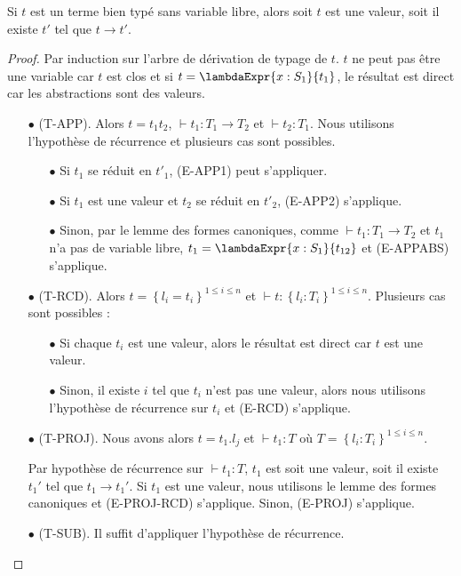 \begin{theorem} [de progression]
  Si $t$ est un terme bien typé sans variable libre, alors soit $t$ est une
  valeur, soit il existe $t'$ tel que $t \rightarrow t'$.
\end{theorem}

\begin{proof}
  Par induction sur l'arbre de dérivation de typage de $t$.
  $t$ ne peut pas être une variable car $t$ est clos et si $t = \lambdaExpr{x :
    S_{1}}{t_{1}}$, le résultat est direct car les abstractions sont des valeurs.
  \begin{itemize}
  \item[$\bullet$] (T-APP). Alors $t = t_{1}t_{2}$, $\vdash t_{1} : T_{1} \rightarrow
    T_{2}$ et $\vdash t_{2} : T_{1}$. Nous utilisons l'hypothèse de récurrence
    et plusieurs cas sont possibles.
    \begin{itemize}
    \item[$\bullet$] Si $t_{1}$ se réduit en $t'_{1}$, (E-APP1) peut s'appliquer.
    \item[$\bullet$] Si $t_{1}$ est une valeur et $t_{2}$ se réduit en $t'_{2}$, (E-APP2) s'applique.
    \item[$\bullet$] Sinon, par le lemme des formes
      canoniques, comme $\vdash t_{1} : T_{1} \rightarrow T_{2}$ et $t_{1}$ n'a
      pas de variable libre, $t_{1} = \lambdaExpr{x : S_{1}}{t_{12}}$ et (E-APPABS) s'applique.
    \end{itemize}
  \item[$\bullet$] (T-RCD). Alors $t = \left\{ l_{i} = t_{i} \right\}^{1 \leq i \leq n}$ et
    $\vdash t : \left\{ l_{i} : T_{i} \right\}^{1 \leq i \leq n}$. Plusieurs cas
    sont possibles :
    \begin{itemize}
    \item[$\bullet$] Si chaque $t_{i}$ est une valeur, alors le résultat est direct car $t$
      est une valeur.
    \item[$\bullet$] Sinon, il existe $i$ tel que $t_{i}$ n'est pas une valeur, alors nous
      utilisons l'hypothèse de récurrence sur $t_{i}$ et (E-RCD) s'applique.
    \end{itemize}
  \item[$\bullet$] (T-PROJ). Nous avons alors
    $t = t_{1}.l_{j}$ et $\vdash t_{1} : T$ où $T = \left\{ l_{i} : T_{i}
    \right\}^{1 \leq i \leq n}$.

  Par hypothèse de récurrence sur $\vdash t_{1} : T$, $t_{1}$ est soit une
  valeur, soit il existe $t_{1}'$ tel que $t_{1} \rightarrow t_{1}'$. Si $t_{1}$
  est une valeur, nous utilisons le lemme
  des formes canoniques
  et (E-PROJ-RCD) s'applique. Sinon, (E-PROJ) s'applique.
  \item[$\bullet$] (T-SUB). Il suffit d'appliquer l'hypothèse de récurrence.
  \end{itemize}
\end{proof}


